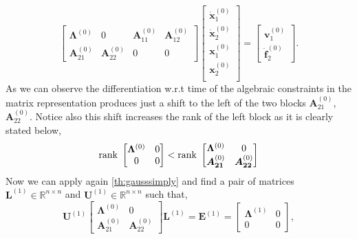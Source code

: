 		\begin{equation}
			\label{eq:DAEafterfirstdiff}
			\begin{bmatrix}
				\bm{\Lambda}^{(0)}	& 0 				& \bm{A}_{11}^{(0)} 	& \bm{A}_{12}^{(0)} \\
				\bm{A}_{21}^{(0)}	& \bm{A}_{22}^{(0)}	& 0 					& 0    
			\end{bmatrix}
			\begin{bmatrix}
				\dot{\bm{x}}_{1}^{(0)}\\
				\dot{\bm{x}}_{2}^{(0)} \\
				\bm{x}_{1}^{(0)}\\
				\bm{x}_{2}^{(0)}\\
			\end{bmatrix}
			= 
			\begin{bmatrix}
				\bm{v}_{1}^{(0)}\\
				\dot{\bm{f}}_{2}^{(0)}
			\end{bmatrix}.
		\end{equation}
		As we can observe the differentiation w.r.t time of the algebraic constraints in the matrix representation produces just a shift to the left of the two blocks $\bm{A}_{21}^{(0)}$, $\bm{A}_{22}^{(0)}$. Notice also this shift increases the rank of the left block as it is clearly stated below,
		\begin{equation}
				\textnormal{rank}~
				\begin{bmatrix}
					\bm{\Lambda}^{(0)} 	& 0 \\
					0 					& 0 
				\end{bmatrix} <
				\textnormal{rank}~
				\begin{bmatrix}
					\bm{\Lambda}^{(0)}	& 0 \\
					\bm{A_{21}}^{(0)}	& \bm{A_{22}}^{(0)}
				\end{bmatrix}
		\end{equation}
		Now we can apply again \cref{th:gausssimply} and find a pair of matrices $\bm{L}^{(1)}\in\mathbb{R}^{n\times n}$ and $\bm{U}^{(1)}\in\mathbb{R}^{n\times n}$ such that,
		\begin{equation*}
			\bm{U}^{(1)}
			\begin{bmatrix}
				\bm{\Lambda}^{(0)}	& 0 \\
				\bm{A}_{21}^{(0)}	& \bm{A}_{22}^{(0)}
			\end{bmatrix}
			\bm{L}^{(1)} 
			= \bm{E}^{(1)} = 
			\begin{bmatrix}
				\bm{\Lambda}^{(1)} 	& 0 \\
				0 					& 0 
			\end{bmatrix},
		\end{equation*}
